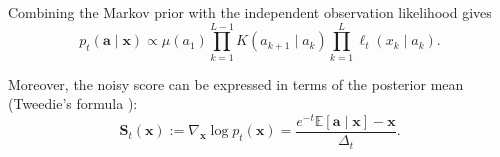 Combining the Markov prior with the independent observation
likelihood gives
\begin{equation}
p_t(\mathbf{a}\mid\mathbf{x})
\propto
\mu(a_1)
\prod_{k=1}^{L-1}K(a_{k+1}\mid a_k)
\prod_{k=1}^{L}\ell_t(x_k\mid a_k).
\label{eq:posterior_chain}
\end{equation}

Moreover, the noisy score can be expressed in terms of the posterior mean
(Tweedie's formula \cite{robbins1956empirical,efron2011tweedie}):
\begin{equation}
    \mathbf S_t(\mathbf x)
    := \nabla_{\mathbf x}\log p_t(\mathbf x)
    =
    \frac{e^{-t}\mathbb E[\mathbf a\mid\mathbf x]-\mathbf x}
         {\Delta_t}.
    \label{eq:tweedie}
\end{equation}


